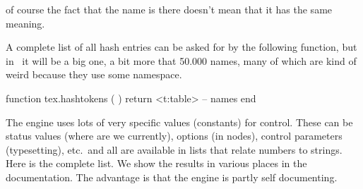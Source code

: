 of course the fact that the name is there doesn't mean that it has the same
meaning.

A complete list of all hash entries can be asked for by the following function, but
in \CONTEXT\ it will be a big one, a bit more that 50.000 names, many of which are
kind of weird because they use some namespace.

\starttyping[option=LUA]
function tex.hashtokens ( )
    return <t:table> -- names
end
\stoptyping

\stopsubsection

\startsubsection[title=Values (constants)]

The engine uses lots of very specific values (constants) for control. These can
be status values (where are we currently), options (in nodes), control parameters
(typesetting), etc.\ and all are available in lists that relate numbers to
strings. Here is the complete list. We show the results in various places in the
documentation. The advantage is that the engine is partly self documenting.

